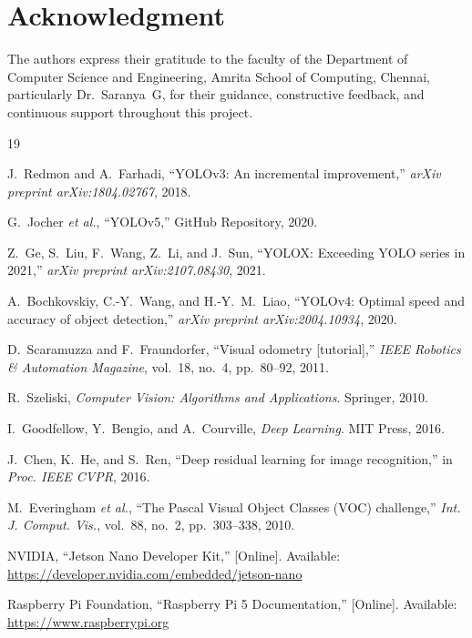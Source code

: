 \documentclass[conference]{IEEEtran}
\begin{document}
\section*{Acknowledgment}
The authors express their gratitude to the faculty of the Department of Computer Science and Engineering, Amrita School of Computing, Chennai, particularly Dr.~Saranya~G, for their guidance, constructive feedback, and continuous support throughout this project.

\begin{thebibliography}{19}

J.~Redmon and A.~Farhadi, ``YOLOv3: An incremental improvement,'' \textit{arXiv preprint arXiv:1804.02767}, 2018.

G.~Jocher \textit{et al.}, ``YOLOv5,'' GitHub Repository, 2020.

Z.~Ge, S.~Liu, F.~Wang, Z.~Li, and J.~Sun, ``YOLOX: Exceeding YOLO series in 2021,'' \textit{arXiv preprint arXiv:2107.08430}, 2021.

A.~Bochkovskiy, C.-Y.~Wang, and H.-Y.~M.~Liao, ``YOLOv4: Optimal speed and accuracy of object detection,'' \textit{arXiv preprint arXiv:2004.10934}, 2020.

D.~Scaramuzza and F.~Fraundorfer, ``Visual odometry [tutorial],'' \textit{IEEE Robotics \& Automation Magazine}, vol.~18, no.~4, pp.~80--92, 2011.

R.~Szeliski, \textit{Computer Vision: Algorithms and Applications}. Springer, 2010.

I.~Goodfellow, Y.~Bengio, and A.~Courville, \textit{Deep Learning}. MIT Press, 2016.

J.~Chen, K.~He, and S.~Ren, ``Deep residual learning for image recognition,'' in \textit{Proc. IEEE CVPR}, 2016.

M.~Everingham \textit{et al.}, ``The Pascal Visual Object Classes (VOC) challenge,'' \textit{Int. J. Comput. Vis.}, vol.~88, no.~2, pp.~303--338, 2010.

NVIDIA, ``Jetson Nano Developer Kit,'' [Online]. Available: \url{https://developer.nvidia.com/embedded/jetson-nano}

Raspberry Pi Foundation, ``Raspberry Pi 5 Documentation,'' [Online]. Available: \url{https://www.raspberrypi.org}


\end{thebibliography}
\end{document}
